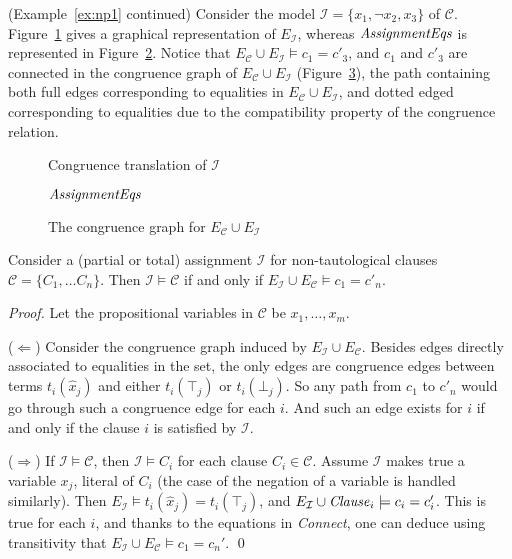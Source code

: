 \documentclass[smallextended]{svjour3}
\newcommand{\Assignment}{{\it AssignmentEqs}}
\newcommand{\Clause}{{\it Clause}}
\newcommand{\Connect}{{\it Connect}}
\begin{document}
\begin{example}\label{ex:np2} (Example~\ref{ex:np1} continued)  
Consider the model $\mathcal{I} = \{x_1, \neg x_2, x_3\}$ of\/ $\mathcal{C}$.
Figure~\ref{fig:npassignment} gives a graphical representation of
$E_{\mathcal{I}}$, whereas $\Assignment$ is represented in
Figure~\ref{fig:npassignmentstar}.  Notice that
$E_{\mathcal{C}} \cup E_{\mathcal{I}} \models c_1 = c'_3$,
and $c_1$ and $c'_3$ are connected in the congruence graph
of $E_{\mathcal{C}} \cup E_{\mathcal{I}}$ (Figure~\ref{fig:npmodel}), the path containing both full edges corresponding to equalities in $E_{\mathcal{C}} \cup E_{\mathcal{I}}$, and dotted edged corresponding to equalities due to the compatibility property of the congruence relation.

\begin{figure}[ht]

\caption{Congruence translation of $\mathcal{I}$}
\label{fig:npassignment}
\end{figure}

\begin{figure}[ht]

\caption{$\Assignment$}
\label{fig:npassignmentstar}
\end{figure}

\begin{figure}[ht]

\caption{The congruence graph for $E_{\mathcal{C}} \cup E_{\mathcal{I}}$}
\label{fig:npmodel}
\end{figure}
\end{example}

\begin{lemma}
\label{lemma:eqv}
Consider a (partial or total) assignment $\mathcal{I}$ for non-tautological
clauses $\mathcal{C}= \{C_1, \dots C_n\}$.  Then $\mathcal{I} \models
\mathcal{C}$ if and only if $E_{\mathcal{I}} \cup E_\mathcal{C} \models c_1 =
c'_n$.
\end{lemma}
\begin{proof}

Let the propositional variables in $\mathcal{C}$ be $x_1,\ldots, x_m$.

($\Leftarrow$)  Consider the congruence graph induced by
$E_{\mathcal{I}} \cup E_\mathcal{C}$.  Besides edges directly associated to
equalities in the set, the only edges are congruence edges between terms
$t_i(\hat{x}_j)$ and either $t_i(\top_j)$ or $t_i(\bot_j)$.  So any path from
$c_1$ to $c'_n$ would go through such a congruence edge for each $i$.
And such an edge exists for $i$ if and only if the clause $i$ is satisfied by
$\mathcal{I}$.

($\Rightarrow$)  If $\mathcal{I} \models \mathcal{C}$, then
$\mathcal{I} \models C_i$ for each clause $C_i \in \mathcal{C}$.  Assume
$\mathcal{I}$ makes true a variable $x_j$, literal of $C_i$ (the case of
the negation of a variable is handled similarly).  Then $E_{\mathcal{I}} \models
t_i(\hat{x}_j) = t_i(\top_j)$, and $E_{\mathcal{I}} \cup \Clause_i
\models c_i = c_i'$.  This is true for each $i$, and
thanks to the equations in \Connect, one can deduce using transitivity that
$E_{\mathcal{I}} \cup E_\mathcal{C} \models c_1 = c_n'$.
\qed
\end{proof}
\end{document}

